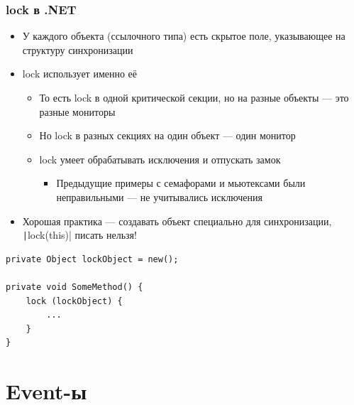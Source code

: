 \documentclass{../../slides-style}
\begin{document}
    \begin{frame}[fragile]
        \frametitle{lock в .NET}
        \begin{itemize}
            \item У каждого объекта (ссылочного типа) есть скрытое поле, указывающее на структуру синхронизации
            \item lock использует именно её
            \begin{itemize}
                \item То есть lock в одной критической секции, но на разные объекты --- это разные мониторы
                \item Но lock в разных секциях на один объект --- один монитор
                \item lock умеет обрабатывать исключения и отпускать замок
                \begin{itemize}
                    \item Предыдущие примеры с семафорами и мьютексами были неправильными --- не учитывались исключения
                \end{itemize}
            \end{itemize}
            \item Хорошая практика --- создавать объект специально для синхронизации, \texttt|lock(this)| писать нельзя!
        \end{itemize}
        \begin{footnotesize}
            \begin{verbatim}
private Object lockObject = new();

private void SomeMethod() {
    lock (lockObject) {
        ...
    }
}
            \end{verbatim}
        \end{footnotesize}
    \end{frame}

    \section{Event-ы}
\end{document}
